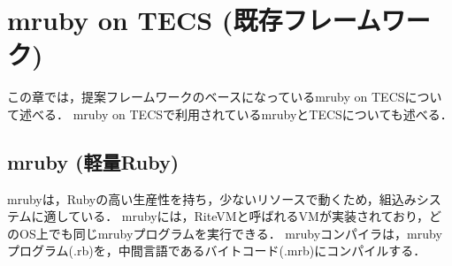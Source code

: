 \documentclass[submit,techrep]{ipsj}
\begin{document}
\vspace{-2mm}
\section{mruby on TECS (既存フレームワーク)}
\vspace{-2mm}
\label{sec:Background}
%
この章では，提案フレームワークのベースになっているmruby on TECSについて述べる．
mruby on TECSで利用されているmrubyとTECSについても述べる．
\vspace{-5mm}
\subsection{mruby (軽量Ruby)}

mrubyは，Rubyの高い生産性を持ち，少ないリソースで動くため，組込みシステムに適している．
mrubyには，RiteVMと呼ばれるVMが実装されており，どのOS上でも同じmrubyプログラムを実行できる．
mrubyコンパイラは，mrubyプログラム(.rb)を，中間言語であるバイトコード(.mrb)にコンパイルする．

\vspace{-5mm}
\end{document}
